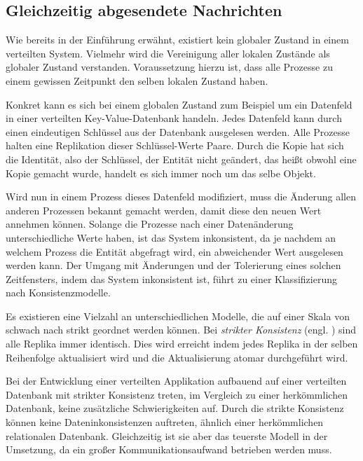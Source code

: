 \subsection{Gleichzeitig abgesendete Nachrichten}
\label{lbl:consistency}
Wie bereits in der Einführung erwähnt, existiert kein globaler Zustand in einem verteilten System.
Vielmehr wird die Vereinigung aller lokalen Zustände als globaler Zustand verstanden.
Voraussetzung hierzu ist, dass alle Prozesse zu einem gewissen Zeitpunkt den selben lokalen Zustand haben.

Konkret kann es sich bei einem globalen Zustand zum Beispiel um ein Datenfeld in einer verteilten Key-Value-Datenbank handeln.
Jedes Datenfeld kann durch einen eindeutigen Schlüssel aus der Datenbank ausgelesen werden.
Alle Prozesse halten eine Replikation dieser Schlüssel-Werte Paare.
Durch die Kopie hat sich die Identität, also der Schlüssel, der Entität nicht geändert, das heißt obwohl eine Kopie gemacht wurde, handelt es sich immer noch um das selbe Objekt.

Wird nun in einem Prozess dieses Datenfeld modifiziert, muss die Änderung allen anderen Prozessen bekannt gemacht werden, damit diese den neuen Wert annehmen können.
Solange die Prozesse nach einer Datenänderung unterschiedliche Werte haben, ist das System inkonsistent, da je nachdem an welchem Prozess die Entität abgefragt wird, ein abweichender Wert ausgelesen werden kann.
Der Umgang mit Änderungen und der Tolerierung eines solchen Zeitfensters, indem das System inkonsistent ist, führt zu einer Klassifizierung nach Konsistenzmodelle.

Es existieren eine Vielzahl an unterschiedlichen Modelle, die auf einer Skala von schwach nach strikt geordnet werden können.
Bei \textit{strikter Konsistenz} (engl. ) sind alle Replika immer identisch. Dies wird erreicht indem jedes Replika in der selben Reihenfolge aktualisiert wird und die Aktualisierung atomar durchgeführt wird.

Bei der Entwicklung einer verteilten Applikation aufbauend auf einer verteilten Datenbank mit strikter Konsistenz treten, im Vergleich zu einer herkömmlichen Datenbank, keine zusätzliche Schwierigkeiten auf.
Durch die strikte Konsistenz können keine Dateninkonsistenzen auftreten, ähnlich einer herkömmlichen relationalen Datenbank.
Gleichzeitig ist sie aber das teuerste Modell in der Umsetzung, da ein großer Kommunikationsaufwand betrieben werden muss.

